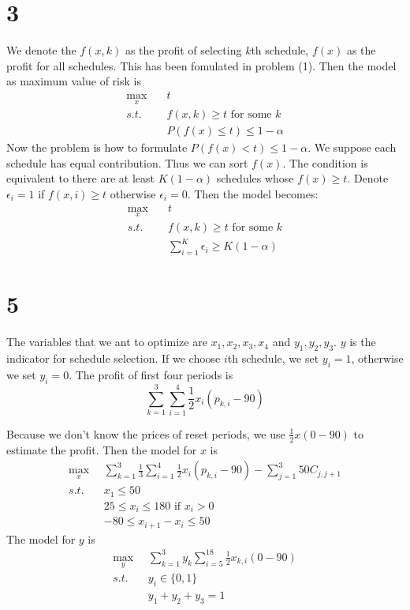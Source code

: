 \documentclass[12pt]{article}
\begin{document}
\section*{3}
We denote the $f(x, k)$ as the profit of selecting $k$th schedule, $f(x)$ as the profit for all schedules. This has been fomulated in problem (1). Then the model as maximum value of risk is
\begin{align}
\max_x \quad & t \nonumber \\
s.t. \quad & f(x, k) \ge t  \text{ for some } k \nonumber \\
& P(f(x) \le t) \le 1 - \alpha \nonumber
\end{align}
Now the problem is how to formulate $P(f(x) < t) \le 1 - \alpha$. We suppose each schedule has equal contribution. Thus we can sort $f(x)$. The condition is equivalent to there are at least $K(1 - \alpha)$ schedules whose $f(x) \ge t$. Denote $\epsilon_i = 1$ if $f(x, i) \ge t$ otherwise $\epsilon_i = 0$. Then the model becomes:
 \begin{align}
\max_x \quad & t \nonumber \\
s.t. \quad & f(x, k) \ge t  \text{ for some } k \nonumber \\
& \sum_{i=1}^K \epsilon_i \ge K(1 - \alpha) \nonumber
\end{align}

\section*{5} 
The variables that we ant to optimize are $x_1, x_2, x_3, x_4$ and $y_1, y_2, y_3$. $y$ is the indicator for schedule selection. If we choose $i$th schedule, we set $y_i = 1$, otherwise we set $y_i = 0$. The profit of first four periods is
\begin{equation}
\sum_{k=1}^{3} \sum_{i=1}^{4} \frac{1}{2} x_i (p_{k, i} - 90) \nonumber
\end{equation}

Because we don't know the prices of reset periods, we use $\frac{1}{2} x (0 - 90)$ to estimate the profit. Then the model for $x$ is
\begin{align}
\max_{x} & \sum_{k=1}^{3} \frac{1}{3} \sum_{i=1}^{4} \frac{1}{2} x_i (p_{k, i} - 90) - \sum_{j=1}^{3} 50C_{j, j+1} \nonumber \\
s.t. \quad & x_1 \le 50 \nonumber \\ 
& 25 \le x_i \le 180 \text{ if } x_i > 0 \nonumber \\
& -80 \le x_{i+1} - x_i \le 50 \nonumber 
\end{align}
The model for $y$ is
\begin{align}
\max_y & \sum_{k=1}^{3} y_k \sum_{i=5}^{18} \frac{1}{2} x_{k, i} (0 - 90) \nonumber \\
s.t. \quad & y_i \in \{ 0, 1 \} \nonumber \\
& y_1 + y_2 + y_3 = 1 \nonumber
\end{align}
\end{document}
